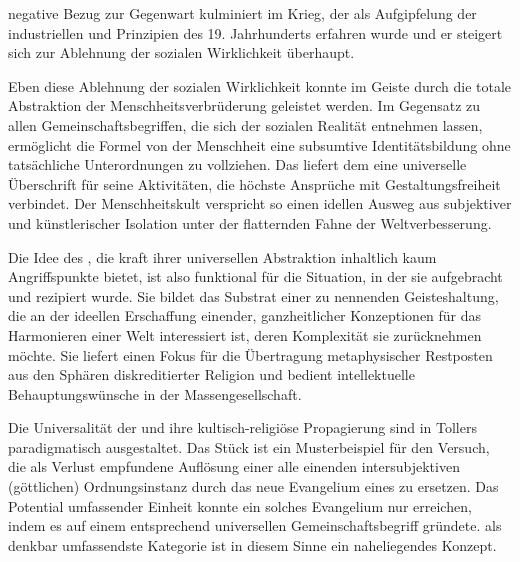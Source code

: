 \begin{BlockQuote}
  [Der] negative Bezug zur Gegenwart kulminiert im Krieg, der als Aufgipfelung
  der industriellen und \Cite{materiellen} Prinzipien des 19. Jahrhunderts
  erfahren wurde und er steigert sich zur Ablehnung der sozialen Wirklichkeit
  überhaupt.
\end{BlockQuote}
Eben diese Ablehnung der sozialen Wirklichkeit konnte im Geiste durch die
totale Abstraktion der Menschheitsverbrüderung geleistet werden. Im Gegensatz
zu allen Gemeinschaftsbegriffen, die sich der sozialen Realität entnehmen
lassen, ermöglicht die Formel von der Menschheit eine subsumtive
Identitätsbildung ohne tatsächliche Unterordnungen zu vollziehen. Das liefert
dem \Cite{Künstler als Protagonist innerer
  Erneuerung} eine universelle
Überschrift für seine Aktivitäten, die höchste Ansprüche mit
Gestaltungsfreiheit verbindet. Der Menschheitskult verspricht so einen idellen
Ausweg aus subjektiver und künstlerischer Isolation unter der flatternden
Fahne der Weltverbesserung.

Die Idee des \Cite{Menschheitskultes}, die kraft ihrer universellen
Abstraktion inhaltlich kaum Angriffspunkte bietet, ist also funktional für die
Situation, in der sie aufgebracht und rezipiert wurde. Sie bildet das Substrat
einer \Cite{gegenmodern} zu nennenden Geisteshaltung, die an der ideellen
Erschaffung einender, ganzheitlicher Konzeptionen für das Harmonieren einer
Welt interessiert ist, deren Komplexität sie zurücknehmen
möchte. Sie liefert einen Fokus für die Übertragung metaphysischer Restposten
aus den Sphären diskreditierter Religion und bedient intellektuelle
Behauptungswünsche in der Massengesellschaft.  

Die Universalität der  und ihre kultisch-religiöse
Propagierung sind in Tollers  paradigmatisch ausgestaltet. 
Das Stück ist ein Musterbeispiel für den Versuch, die als Verlust empfundene
Auflösung einer alle einenden intersubjektiven (göttlichen) Ordnungsinstanz
durch das neue Evangelium eines  zu ersetzen. Das
Potential umfassender Einheit konnte ein solches Evangelium nur erreichen,
indem es auf einem entsprechend universellen Gemeinschaftsbegriff gründete. 
\Cite{Die Menschheit} als denkbar umfassendste Kategorie ist in diesem Sinne
ein naheliegendes Konzept.

